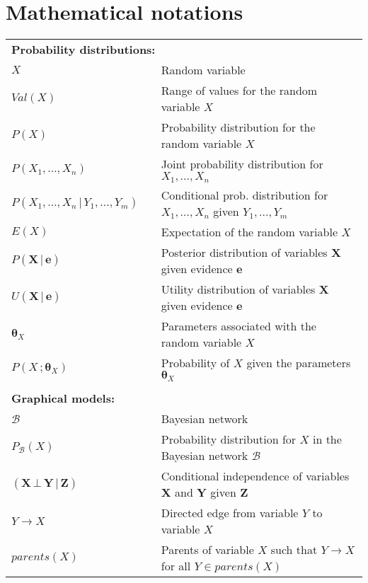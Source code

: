 
\chapter*{Mathematical notations}
\thispagestyle{empty}
\pagestyle{empty}                                                           

\begin{longtable}{lp{5mm}p{11cm}}
\multicolumn{3}{l}{\textbf{Probability distributions:}} \vspace{2mm} \\
$X$ && Random variable \\
$\mathit{Val}(X)$ && Range of values for the random variable $X$ \\
$P(X)$ && Probability distribution for the random variable $X$ \\
$P(X_1, \dots, X_n)$ && Joint probability distribution for $X_1, \dots, X_n$ \\
$P(X_1, \dots, X_n \, | \, Y_1, \dots, Y_m)$ && Conditional prob. distribution for $X_1, \dots, X_n$ given $Y_1, \dots, Y_m$  \\ 
$E(X)$ && Expectation of the random variable $X$ \\
 $P(\mathbf{X}  \, | \,  \mathbf{e})$ && Posterior distribution of variables $\mathbf{X}$ given evidence $\mathbf{e}$ \\ 
 $U(\mathbf{X}  \, | \,  \mathbf{e})$ && Utility distribution of variables $\mathbf{X}$ given evidence $\mathbf{e}$ \\ 
 $\boldsymbol\theta_{X}$ && Parameters associated with the random variable $X$ \\ 
 $P(X\,;\boldsymbol\theta_{X})$ && Probability of $X$ given the parameters $\boldsymbol\theta_{X}$ \\ 
 
&&  \vspace{0mm} \\
\multicolumn{3}{l}{\textbf{Graphical models:}} \vspace{2mm} \\
 $\mathcal{B}$ && Bayesian network \\
 $P_\mathcal{B}(X)$ && Probability distribution for $X$ in the Bayesian network $\mathcal{B}$ \\ 
$(\mathbf{X} \, \bot \, \mathbf{Y} \, | \, \mathbf{Z})$ && Conditional independence of variables $\mathbf{X} $ and $\mathbf{Y}$ given $\mathbf{Z}$ \\
$Y \rightarrow X$ && Directed edge from variable $Y$ to variable $X$ \\
$\mathit{parents}(X)$ && Parents of variable $X$ such that $Y \rightarrow X$ for all $Y\!\in\!parents(X)$ \\


\end{longtable}

